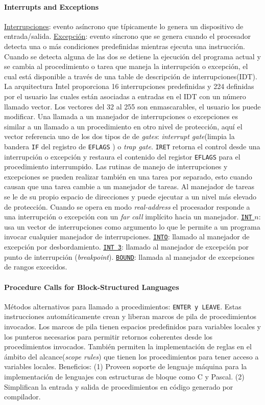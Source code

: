 \paragraph{\textnormal{\textbf{Interrupts and Exceptions}}}
\underline{Interrupciones}: evento asíncrono que típicamente lo genera un dispositivo de entrada/salida. \underline{Excepción}: evento síncrono que se genera cuando el procesador detecta una o más condiciones predefinidas mientras ejecuta una instrucción. Cuando se detecta alguna de las dos se detiene la ejecución del programa actual y se cambia al procedimiento o tarea que maneja la interrupción o excepción, el cual está disponible a través de una table de descripción de interrupciones(IDT). La arquitectura Intel proporciona 16 interrupciones predefinidas y 224 definidas por el usuario las cuales están asociadas a entradas en el IDT con un número llamado vector. Los vectores del 32 al 255 son enmascarables, el usuario los puede modificar. Una llamada a un manejador de interrupciones o excepciones es similar a un llamado a un procedimiento en otro nivel de protección, aquí el vector referencia uno de los dos tipos de de \textit{gates}: \textit{interrupt gate}(limpia la bandera \texttt{IF} del registro de \texttt{EFLAGS} ) o \textit{trap gate}. \texttt{IRET} retorna el control desde una interrupción o excepción y restaura el contenido del registor \texttt{EFLAGS} para el procedimiento interrumpido. Las rutinas de manejo de interrupciones y excepciones se pueden realizar también en una tarea por separado, esto cuando causan que una tarea cambie a un manejador de tareas. Al manejador de tareas se le de su propio espacio de direcciones y puede ejecutar a un nivel más elevado de protección. Cuando se opera en modo \textit{real-address} el procesador responde a una interrupción o excepción con un \textit{far call} implícito hacia un manejador. \underline{\texttt{INT} $n$}: usa un vector de interrupciones como argumento lo que le permite a un programa invocar cualquier manejador de interrupciones. \underline{\texttt{INTO}}: llamado al manejador de excepción por desbordamiento. \underline{\texttt{INT 3}}: llamado al manejador de excepción por punto de interrupción (\textit{breakpoint}). \underline{\texttt{BOUND}}: llamada al manejador de excepciones de rangos excecidos.

\paragraph{\textnormal{\textbf{Procedure Calls for Block-Structured Languages}}}
Métodos alternativos para llamado a procedimientos: \texttt{ENTER \textnormal{y} LEAVE}. Estas instrucciones automáticamente crean y liberan marcos de pila de procedimientos invocados. Los marcos de pila tienen espacios predefinidos para variables locales y los punteros necesarios para permitir retornos coherentes desde los procedimientos invocados. También permiten la implementación de reglas en el ámbito del alcance(\textit{scope rules}) que tienen los procedimientos para tener acceso a variables locales. Beneficios: (1) Proveen soporte de lenguaje máquina para la implementación de lenguajes con estructuras de bloque como C y Pascal. (2) Simplifican la entrada y salida de procedimientos en código generado por compilador.

